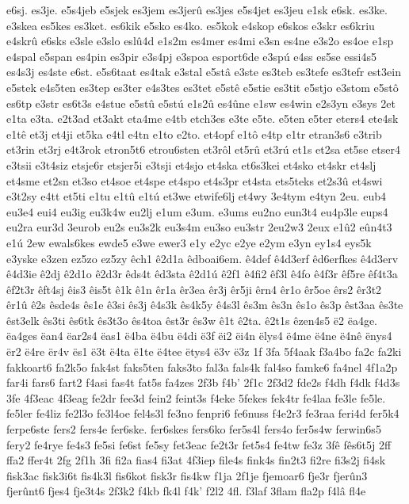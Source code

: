 {e6sj.
es3je.
e5s4jeb
e5sjek
es3jem
es3jerû
es3jes
e5s4jet
es3jeu
e1sk
e6sk.
es3ke.
e3skea
es5kes
es3ket.
es6kik
e5sko
es4ko.
es5kok
e4skop
e6skos
e3skr
es6kriu
e4skrû
e6sks
e3sle
e3slo
eslû4d
e1s2m
es4mer
es4mi
e3sn
es4ne
e3s2o
es4oe
e1sp
e4spal
e5span
es4pin
es3pir
e3s4pj
e3spoa
esport6de
e3spú
e4ss
es5se
essi4s5
es4s3j
es4ste
e6st.
e5s6taat
es4tak
e3stal
e5stâ
e3ste
es3teb
es3tefe
es3tefr
est3ein
e5stek
e4s5ten
es3tep
es3ter
e4s3tes
es3tet
e5stê
e5stie
es3tit
e5stjo
e3stom
e5stô
es6tp
e3str
es6t3s
e4stue
e5stû
e5stú
e1s2û
es4ûne
e1sw
es4win
e2s3yn
e3sys
2et
e1ta
e3ta.
e2t3ad
et3akt
eta4me
e4tb
etch3es
e3te
e5te.
e5ten
e5ter
eters4
ete4sk
e1tê
et3j
et4ji
et5ka
e4tl
e4tn
e1to
e2to.
et4opf
e1tô
e4tp
e1tr
etran3s6
e3trib
et3rin
et3rj
e4t3rok
etron5t6
etrou6sten
et3rôl
et5rû
et3rú
et1s
et2sa
et5se
etser4
e3tsii
e3t4siz
etsje6r
etsjer5i
e3tsji
et4sjo
et4ska
et6s3kei
et4sko
et4skr
et4slj
et4sme
et2sn
et3so
et4soe
et4spe
et4spo
et4s3pr
et4sta
ets5teks
et2s3û
et4swi
e3t2sy
e4tt
et5ti
e1tu
e1tû
e1tú
et3we
etwife6lj
et4wy
3e4tym
e4tyn
2eu.
eub4
eu3e4
eui4
eu3ig
eu3k4w
eu2lj
e1um
e3um.
e3ums
eu2no
eun3t4
eu4p3le
eups4
eu2ra
eur3d
3eurob
eu2s
eu3s2k
eu3s4m
eu3so
eu3str
2eu2w3
2eux
e1û2
eûn4t3
e1ú
2ew
ewals6kes
ewde5
e3we
ewer3
e1y
e2yc
e2ye
e2ym
e3yn
ey1s4
eys5k
e3yske
e3zen
ez5zo
ez5zy
êch1
ê2d1a
êdboai6em.
ê4def
ê4d3erf
êd6erfkes
ê4d3erv
ê4d3ie
ê2dj
ê2d1o
ê2d3r
êds4t
êd3sta
ê2d1ú
ê2f1
ê4fi2
êf3l
ê4fo
ê4f3r
êf5re
êf4t3a
êf2t3r
êft4sj
êis3
êis5t
ê1k
ê1n
êr1a
êr3ea
êr3j
êr5ji
êrn4
êr1o
êr5oe
êrs2
êr3t2
êr1û
ê2s
êsde4s
ês1e
ê3si
ês3j
ê4s3k
ês4k5y
ê4s3l
ês3m
ês3n
ês1o
ês3p
êst3aa
ês3te
êst3elk
ês3ti
ês6tk
ês3t3o
ês4toa
êst3r
ês3w
ê1t
ê2ta.
ê2t1s
êzen4s5
ë2
ëa4ge.
ëa4ges
ëan4
ëar2s4
ëas1
ë4ba
ë4bu
ë4di
ë3f
ëi2
ëi4n
ëlys4
ë4me
ë4ne
ë4nê
ënys4
ër2
ë4re
ër4v
ës1
ë3t
ë4ta
ë1te
ë4tee
ëtys4
ë3v
ë3z
1f
3fa
5f4aak
f3a4bo
fa2c
fa2ki
fakkoart6
fa2k5o
fak4st
faks5ten
faks3to
fal3a
fals4k
fal4so
famke6
fa4nel
4f1a2p
far4i
fars6
fart2
f4asi
fas4t
fat5s
fa4zes
2f3b
f4b'
2f1c
2f3d2
fde2s
f4dh
f4dk
f4d3s
3fe
4f3eac
4f3eag
fe2dr
fee3d
fein2
feint3s
f4eke
5fekes
fek4tr
fe4laa
fe3le
fe5le.
fe5ler
fe4liz
fe2l3o
fe3l4oe
fel4s3l
fe3no
fenpri6
fe6nuss
f4e2r3
fe3raa
feri4d
fer5k4
ferpe6ste
fers2
fers4e
fer6ske.
fer6skes
fers6ko
fer5s4l
fers4o
fer5s4w
ferwin6s5
fery2
fe4rye
fe4s3
fe5si
fe6st
fe5sy
fet3eac
fe2t3r
fet5s4
fe4tw
fe3z
3fê
fês6t5j
2ff
ffa2
ffer4t
2fg
2f1h
3fi
fi2a
fias4
fi3at
4f3iep
file4s
fink4s
fin2t3
fi2re
fi3s2j
fi4sk
fisk3ac
fisk3i6t
fis4k3l
fis6kot
fisk3r
fis4kw
f1ja
2f1je
fjemoar6
fje3r
fjerûn3
fjerûnt6
fjes4
fje3t4s
2f3k2
f4kb
fk4l
f4k'
f2l2
4fl.
f3laf
3flam
fla2p
f4lâ
fl4e
}
